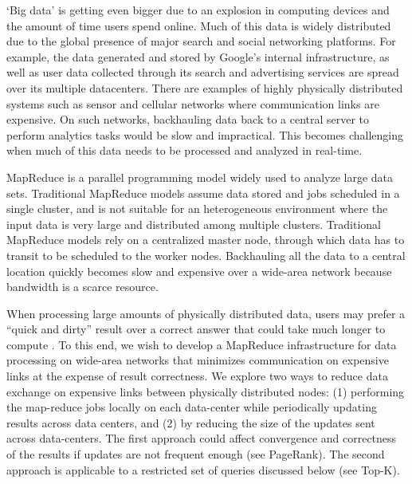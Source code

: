 ‘Big data’ is getting even bigger due to an explosion in computing devices and the amount of time users spend online. Much of this data is widely distributed due to the global presence of major search and social networking platforms. For example, the data generated and stored by Google’s internal infrastructure, as well as user data collected through its search and advertising services are spread over its multiple datacenters. There are examples of highly physically distributed systems such as sensor and cellular networks where communication links are expensive. On such networks,  backhauling data back to a central server to perform analytics tasks would be slow and impractical. This becomes challenging when much of this data needs to be processed and analyzed in real-time.   

MapReduce is a parallel programming model widely used to analyze large data sets. Traditional MapReduce models assume data stored and jobs scheduled in a single cluster, and is not suitable for an heterogeneous environment where the input data is very large and distributed among multiple clusters. Traditional MapReduce models rely on a centralized master node, through which data has to transit to be scheduled to the worker nodes. Backhauling all the data to a central location quickly becomes slow and expensive over a wide-area network because bandwidth is a scarce resource.

When processing large amounts of physically distributed data, users may prefer a “quick and dirty” result over a correct answer that could take much longer to compute \cite{3, 4}. To this end, we wish to develop a MapReduce infrastructure for data processing on wide-area networks that minimizes communication on expensive links at the expense of result correctness. We explore two ways to reduce data exchange on expensive links between physically distributed nodes: (1) performing the map-reduce jobs locally on each data-center while periodically updating results across data centers, and (2) by reducing the size of the updates sent across data-centers. The first approach could affect convergence and correctness of the results if updates are not frequent enough (see PageRank). The second approach is applicable to a restricted set of queries discussed below (see Top-K).